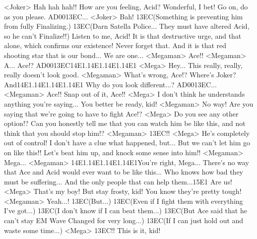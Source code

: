 <Joker> Hah hah hah!! 
How are you feeling, Acid? Wonderful, I bet! 
Go on, do as you please. 
{AD}{00}{13}{EC}... 
<Joker> Bah! 
{13}{EC}(Something is preventing  him from fully Finalizing.) 
{13}{EC}(Darn Satella Police...  They must have altered  Acid, so he can't Finalize!!) 
Listen to me, Acid! It is that destructive urge, 
and that alone, which confirms our existence! 
Never forget that. 
And it is that red shooting star that is our bond... 
We are one... 
<Megaman> Ace!! 
<Megaman> A... Ace!? 
{AD}{00}{13}{EC}{14}{E1}.{14}{E1}.{14}{E1}.{14}{E1} 
<Mega> Hey... 
This really, really, really doesn't look good. 
<Megaman> What's wrong, Ace!? 
Where's Joker? 
And{14}{E1}.{14}{E1}.{14}{E1}.{14}{E1} Why do you look different...? 
{AD}{00}{13}{EC}... 
<Megaman> Ace!! 
Snap out of it, Ace!! 
<Mega> I don't think he understands anything you're saying... 
You better be ready, kid! 
<Megaman> No way! 
Are you saying that we're going to have to fight Ace!? 
<Mega> Do you see any other option!? 
Can you honestly tell me that you can watch him be 
like this, and not think that you should stop him!? 
<Megaman> {13}{EC}!! 
<Mega> He's completely out of control! 
I don't have a clue what happened, but... 
But we can't let him go on like this!! 
Let's beat him up, and knock some sense into him!! 
<Megaman> Mega... 
<Megaman> {14}{E1}.{14}{E1}.{14}{E1}.{14}{E1}You're right, Mega... 
There's no way that Ace and Acid would ever want to be like this... 
Who knows how bad they must be suffering... 
And the only people that can help them...{15}{E1} Are us! 
<Mega> That's my boy! 
But stay frosty, kid! You know they're pretty tough! 
<Megaman> Yeah...! 
{13}{EC}(But...) 
{13}{EC}(Even if I fight them  with everything I've got...) 
{13}{EC}(I don't know if  I can beat them...) 
{13}{EC}(But Ace said that  he can't stay EM Wave  Changed for very long...) 
{13}{EC}(If I can just hold out  and waste some time...) 
<Mega> {13}{EC}!! 
This is it, kid! 
